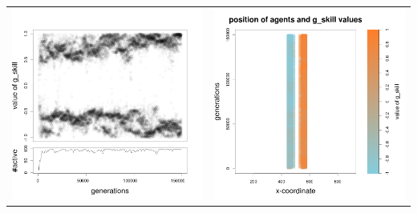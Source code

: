 \documentclass[a4paper,10pt]{article}
\begin{document}
\begin{table}[h!]
\begin{tabular}{cc}
 \newline
 \includegraphics[width=\imgSize]{images/5StaticEnv/Gplot58_staticEnv4}&\includegraphics[width=\imgSize]{images/5StaticEnv/Gplot58Static_staticEnv4}\\
 \end{tabular}

\end{table}
\end{document}
